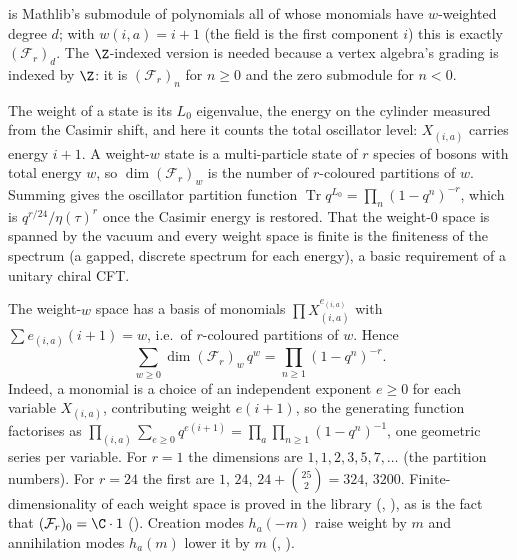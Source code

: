 \begin{dictionary}
 is Mathlib's submodule of polynomials all of whose
monomials have $w$-weighted degree $d$; with $w(i,a)=i+1$ (the field  is the first
component $i$) this is exactly $(\mathcal F_r)_d$. The $\Z$-indexed version  is
needed because a vertex algebra's grading is indexed by $\Z$: it is $(\mathcal F_r)_n$ for $n\ge0$
and the zero submodule  for $n<0$.
\end{dictionary}

\begin{physics}
The weight of a state is its $L_0$ eigenvalue, the energy on the cylinder measured from the Casimir shift, and here it counts the total oscillator level: $X_{(i,a)}$ carries energy $i+1$. A weight-$w$ state is a multi-particle state of $r$ species of bosons with total energy $w$, so $\dim(\mathcal F_r)_w$ is the number of $r$-coloured partitions of $w$. Summing gives the oscillator partition function $\operatorname{Tr}q^{L_0}=\prod_n(1-q^n)^{-r}$, which is $q^{r/24}/\eta(\tau)^{r}$ once the Casimir energy is restored. That the weight-$0$ space is spanned by the vacuum and every weight space is finite is the finiteness of the spectrum (a gapped, discrete spectrum for each energy), a basic requirement of a unitary chiral CFT.
\end{physics}

The weight-$w$ space has a basis of monomials $\prod X_{(i,a)}^{e_{(i,a)}}$ with
$\sum e_{(i,a)}(i+1)=w$, i.e.\ of $r$-coloured partitions of $w$. Hence
\begin{equation}\label{ch03:eq:fockchar}
  \sum_{w\ge0}\dim(\mathcal F_r)_w\,q^w=\prod_{n\ge1}(1-q^n)^{-r}.
\end{equation}
Indeed, a monomial is a choice of an independent exponent $e\ge0$ for each variable $X_{(i,a)}$,
contributing weight $e(i+1)$, so the generating function factorises as
$\prod_{(i,a)}\sum_{e\ge0}q^{e(i+1)}=\prod_{a}\prod_{n\ge1}(1-q^n)^{-1}$, one geometric series per
variable.
For $r=1$ the dimensions are $1,1,2,3,5,7,\dots$ (the partition numbers). For $r=24$ the first are
$1$, $24$, $24+\binom{25}{2}=324$, $3200$. Finite-dimensionality of each weight space is proved in
the library (, ), as is the fact that
$(\mathcal F_r)_0=\C\cdot 1$ (). Creation modes $h_a(-m)$ raise
weight by $m$ and annihilation modes $h_a(m)$ lower it by $m$ (,
).

